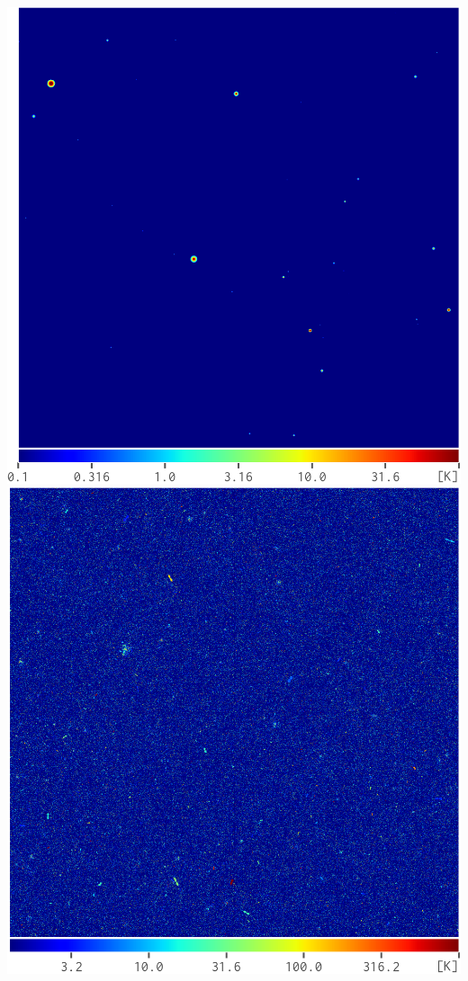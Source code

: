 \documentclass{beamer}
\begin{document}
\begin{frame}[c]{}
  \hfill
  \includegraphics[height=0.55\textheight]{skymap-halos-f158}
  \hspace{1em}
  \includegraphics[height=0.55\textheight]{skymap-ptrsrc-f158}

\end{frame}
\end{document}
